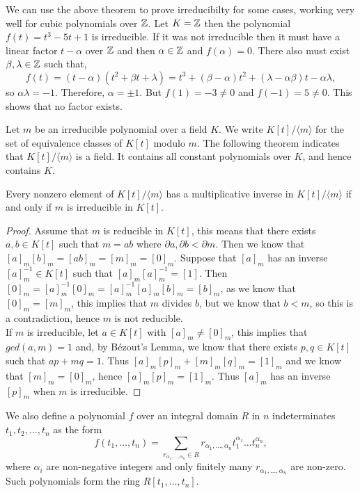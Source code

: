 \begin{example}
    We can use the above theorem to prove irreducibilty for some cases, working very well for cubic polynomials over $\mathbb Z$. Let $K = \mathbb Z$ then the polynomial $f(t) = t^3 -5 t + 1$ is irreducible. If it was not irreducible then it must have a linear factor $t - \alpha$ over $\mathbb Z$ and then $\alpha \in \mathbb Z$ and $f(\alpha) = 0$. There also must exist $\beta, \lambda \in \mathbb Z$ such that,
    $$
    f(t) = (t-\alpha)(t^2 + \beta t + \lambda) = t^3 + (\beta - \alpha)t^2 + (\lambda - \alpha \beta)t - \alpha \lambda,
    $$
    so $\alpha \lambda = -1$. Therefore, $\alpha = \pm 1$. But $f(1) = -3 \neq 0$ and $f(-1) = 5 \neq 0$. This shows that no factor exists.
\end{example}

Let $m$ be an irreducible polynomial over a field $K$. We write
$
K[t] /\langle m\rangle
$
for the set of equivalence classes of $K[t]$ modulo $m$. 
The following theorem indicates that $K[t] / \langle m \rangle$ is a field. It contains all constant polynomials over $K$, and hence contains $K$.


\begin{theorem}
    Every nonzero element of $K[t] /\langle m\rangle$ has a multiplicative inverse in $K[t] /\langle m\rangle$ if and only if $m$ is irreducible in $K[t]$.
\end{theorem}

\begin{proof}
    Assume that \(m\) is reducible in \(K[t]\), this means that there exists \(a,b \in K[t]\) such that \(m = ab\) where \(\partial a,\partial b < \partial m\). Then we know that \([a]_m[b]_m = [ab]_m = [m]_m = [0]_m\). Suppose that \([a]_m\) has an inverse \([a]_m^{-1} \in K[t]\) such that \([a]_m[a]_m^{-1} = [1]\). Then \([0]_m = [a]_m^{-1}[0]_m = [a]_m^{-1}[a]_m[b]_m = [b]_m\), as we know that \([0]_m = [m]_m\), this implies that \(m\) divides \(b\), but we know that \(b < m\), so this is a contradiction, hence \(m\) is not reducible. \\
    If \(m\) is irreducible, let \(a \in K[t]\) with \([a]_m \neq [0]_m\), this implies that \(gcd(a,m)=1\) and, by Bézout's Lemma, we know that there exists \(p,q \in K[t]\) such that \(ap + mq = 1\). Thus \([a]_m[p]_m + [m]_m[q]_m = [1]_m\) and we know that \([m]_m = [0]_m\), hence \([a]_m[p]_m = [1]_m\). Thus \([a]_m\) has an inverse \([p]_m\) when \(m\) is irreducible.
\end{proof}


We also define a polynomial $f$ over an integral domain $R$ in $n$ indeterminates $t_1, t_2, \dots, t_n$ as the form 
$$
f(t_1, \dots, t_n) = \sum _{ r_{\alpha_1, \dots, \alpha_n} \in R}  r_{\alpha_1, \dots, \alpha_n} t_1^{\alpha_1} \dots t_n ^{\alpha_n},
$$
where $\alpha_i$ are non-negative integers and only finitely many $r_{\alpha_1, \dots, \alpha_n}$ are non-zero. Such polynomials form the ring $R[t_1, \dots, t_n]$.


